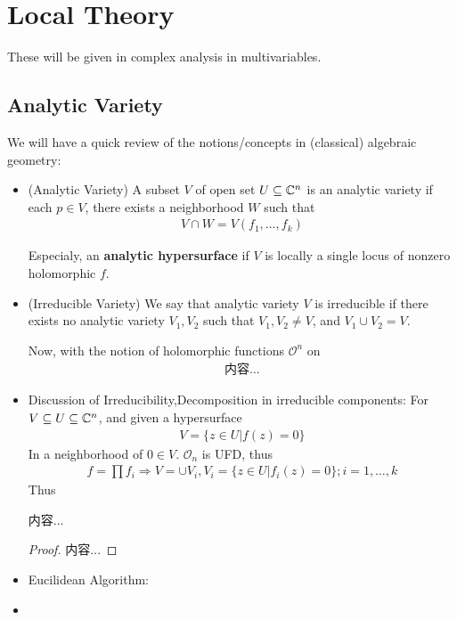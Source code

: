 \documentclass[Total.tex]{subfiles}
\begin{document}
	\chapter{Local Theory}
		These will be given in complex analysis in multivariables.
		
		\section{Analytic Variety}
			We will have a quick review of the notions/concepts in (classical) algebraic geometry:
			\begin{itemize}
				\item (Analytic Variety) A subset $V$ of open set $U\subseteq \mathbb{C}^n$ is an analytic variety if each $p\in V$, there exists a neighborhood $W$ such that
				\begin{gather*}
					V\cap W=V(f_1,\dots,f_k)
				\end{gather*}
				
				Especialy, an \textbf{analytic hypersurface} if $V$ is locally a single locus of nonzero holomorphic $f$.
				\item (Irreducible Variety) We say that analytic variety $V$ is irreducible if there exists no analytic variety $V_1,V_2$ such that $V_1,V_2\not=V$, and $V_1\cup V_2=V$.
				
				Now, with the notion of holomorphic functions $\mathcal{O}^n$ on 
				\begin{gather*}
					内容...
				\end{gather*}
				\item Discussion of Irreducibility,Decomposition in irreducible components: For $V\subseteq U\subseteq \mathbb{C}^n$, and given a hypersurface
				\begin{gather*}
					V=\{z\in U|f(z)=0\}
				\end{gather*}
				In a neighborhood of $0\in V$. $\mathcal{O}_n$ is UFD, thus
				\begin{gather*}
					f=\prod f_i\Rightarrow V=\cup V_i,V_i=\{z\in U|f_i(z)=0\};i=1,\dots,k
				\end{gather*}
				Thus
				\begin{proposition}
					内容...
				\end{proposition}
				\begin{proof}
					内容...
				\end{proof}
				\item Eucilidean Algorithm:
				\item 
			\end{itemize}
\end{document}
